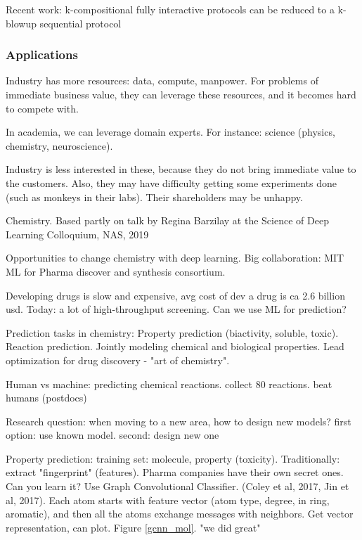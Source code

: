 \documentclass[english]{article}
\begin{document}
Recent work: k-compositional fully interactive protocols can be reduced to a k-blowup sequential protocol


\eenum







\subsubsection{Applications}


\benum 
\item Industry has more resources: data, compute, manpower. For problems of immediate business value, they can leverage these resources, and it becomes hard to compete with.
\item In academia, we can leverage domain experts. For instance: science (physics, chemistry, neuroscience). 

Industry is less interested in these, because they do not bring immediate value to the customers. Also, they may have difficulty getting some experiments done (such as monkeys in their labs). Their shareholders may be unhappy.

\item Chemistry. Based partly on talk by Regina Barzilay at the Science of Deep Learning Colloquium, NAS, 2019

Opportunities to change chemistry with deep learning. Big collaboration: MIT ML for Pharma discover and synthesis consortium.

Developing drugs is slow and expensive, avg cost of dev a drug is ca 2.6 billion usd. Today: a lot of high-throughput screening. Can we use ML for prediction?

Prediction tasks in chemistry: Property prediction (biactivity, soluble, toxic). Reaction prediction. Jointly modeling chemical and biological properties. Lead optimization for drug discovery - "art of chemistry".

Human vs machine:  predicting chemical reactions. collect 80 reactions. beat humans (postdocs)

Research question: when moving to a new area, how to design new models? first option: use known model. second: design new one

Property prediction: training set: molecule, property (toxicity). Traditionally: extract "fingerprint" (features). Pharma companies have their own secret ones. Can you learn it? Use Graph Convolutional Classifier. (Coley et al, 2017, Jin et al, 2017). Each atom starts with feature vector (atom type, degree, in ring, aromatic), and then all the atoms exchange messages with neighbors. Get vector representation, can plot. Figure \ref{gcnn_mol}. "we did great"  
\end{document}
